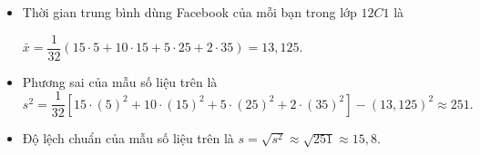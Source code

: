 \begin{ex}
{\begin{itemchoice}
\begin{itemize}
			\item 	Thời gian trung bình dùng Facebook của mỗi bạn trong lớp $12C1$ là
			
			$\bar{x}=\dfrac{1}{32}(15\cdot 5+10\cdot 15+5\cdot 25+2\cdot 35)=13{,}125$.
					
			
			\item 	Phương sai của mẫu số liệu trên là
						$$
			s^2=\dfrac{1}{32}\left[15\cdot (5)^2+10\cdot (15)^2+5\cdot (25)^2+2\cdot (35)^2\right]-(13{,}125)^2 \approx 251.
			$$
			
			\item 	Độ lệch chuẩn của mẫu số liệu trên là
			$s=\sqrt{s^2} \approx \sqrt{251} \approx 15{,}8$.
		\end{itemize}
	\end{itemchoice}
	}
\end{ex}

